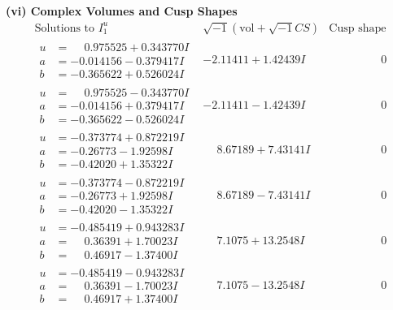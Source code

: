 \documentclass[1p]{elsarticle_modified}
\theoremstyle{definition}
\newcommand{\I}{\sqrt{-1}}
\begin{document}
\newpage\flushleft \textbf{(vi) Complex Volumes and Cusp Shapes}
$$\begin{array}{c|c|c}  
\text{Solutions to }I^u_{1}& \I (\text{vol} + \sqrt{-1}CS) & \text{Cusp shape}\\
 \hline 
\begin{aligned}
u &= \phantom{-}0.975525 + 0.343770 I \\
a &= -0.014156 - 0.379417 I \\
b &= -0.365622 + 0.526024 I\end{aligned}
 & -2.11411 + 1.42439 I & \phantom{-0.000000 } 0 \\ \hline\begin{aligned}
u &= \phantom{-}0.975525 - 0.343770 I \\
a &= -0.014156 + 0.379417 I \\
b &= -0.365622 - 0.526024 I\end{aligned}
 & -2.11411 - 1.42439 I & \phantom{-0.000000 } 0 \\ \hline\begin{aligned}
u &= -0.373774 + 0.872219 I \\
a &= -0.26773 - 1.92598 I \\
b &= -0.42020 + 1.35322 I\end{aligned}
 & \phantom{-}8.67189 + 7.43141 I & \phantom{-0.000000 } 0 \\ \hline\begin{aligned}
u &= -0.373774 - 0.872219 I \\
a &= -0.26773 + 1.92598 I \\
b &= -0.42020 - 1.35322 I\end{aligned}
 & \phantom{-}8.67189 - 7.43141 I & \phantom{-0.000000 } 0 \\ \hline\begin{aligned}
u &= -0.485419 + 0.943283 I \\
a &= \phantom{-}0.36391 + 1.70023 I \\
b &= \phantom{-}0.46917 - 1.37400 I\end{aligned}
 & \phantom{-}7.1075 + 13.2548 I & \phantom{-0.000000 } 0 \\ \hline\begin{aligned}
u &= -0.485419 - 0.943283 I \\
a &= \phantom{-}0.36391 - 1.70023 I \\
b &= \phantom{-}0.46917 + 1.37400 I\end{aligned}
 & \phantom{-}7.1075 - 13.2548 I & \phantom{-0.000000 } 0 \\ \hline\begin{aligned}

\end{aligned}
\end{array}$$
\end{document}
